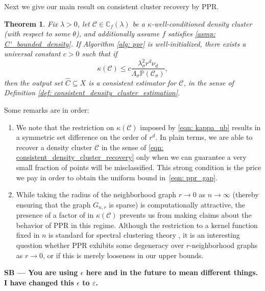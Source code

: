 \documentclass[11pt,twoside]{article}
\newtheorem{theorem}{Theorem}
\newcommand{\1}{\mathbf{1}}
\newcommand{\Xbf}{X}             %
\newcommand{\Pbb}{\mathbb{P}}
\newcommand{\Cbb}{\mathbb{C}}
\newcommand{\Cset}{\mathcal{C}}
\newcommand{\Csig}{\Cset_{\sigma}}
\newcommand{\Cest}{\widehat{C}}
\newcommand{\sbcomment}[1]{{\color{red} \bf{{{{SB --- #1}}}}}}
\begin{document}
Next we give our main result on consistent cluster recovery by PPR.

\begin{theorem}
  \label{thm: consistent_recovery_of_density_clusters}
  Fix $\lambda > 0$, let $\Cset \in \Cbb_f(\lambda)$ be a
  $\kappa$-well-conditioned density cluster (with respect to some $\theta$), and
  additionally assume $f$ satisfies \ref{asmp: C'_bounded_density}. If Algorithm
  \ref{alg: ppr} is well-initialized, there exists a universal constant $c >  0$
  such that if  
  \begin{equation}
    \label{eqn: kappa_ub}
    \kappa(\Cset) \leq c \frac{\lambda_{\sigma}^2r^d
      \nu_d}{\Lambda_{\sigma}\Pbb(\Csig)}, 
  \end{equation}
  then the output set $\Cest \subseteq \Xbf$ is a consistent estimator for
  $\Cset$, in the sense of Definition \ref{def: consistent_density_cluster_estimation}. 
\end{theorem}
\noindent Some remarks are in order: 
 \begin{enumerate}  
 \item We note that the restriction on $\kappa(\Cset)$ imposed by \eqref{eqn:
    kappa_ub} results in a symmetric set difference \smash{$\Delta(\Csig[\Xbf],
    \Cest)$} on the order of $r^d$. In plain terms, we are able to recover a
  density cluster $\Cset$ in the sense of \eqref{eqn:
    consistent_density_cluster_recovery} only when we can guarantee a very small
  fraction of points will be misclassified. This strong condition is the price
  we pay in order to obtain the uniform bound in~\eqref{eqn: ppr_gap}. 
 \item While taking the radius of the neighborhood graph $r \to 0$ as $n \to
  \infty$ (thereby ensuring that the graph $G_{n,r}$ is sparse) is computationally
  attractive, the presence of a factor of  in
  $\kappa(\Cset)$ prevents us from making claims about the
  behavior of PPR in this regime. Although the restriction to a kernel
  function fixed in $n$ is standard for spectral clustering theory
  \citep{schiebinger2015,vonluxburg2008}, it is an interesting question whether
  PPR exhibits some degeneracy over $r$-neighborhood graphs as $r \to 0$, or if
  this is merely looseness in our upper bounds.  
\end{enumerate}
\sbcomment{You are using $\epsilon$ here and in the future to mean different things. I have
changed this $\epsilon$ to $\varepsilon$.} 
\end{document}
